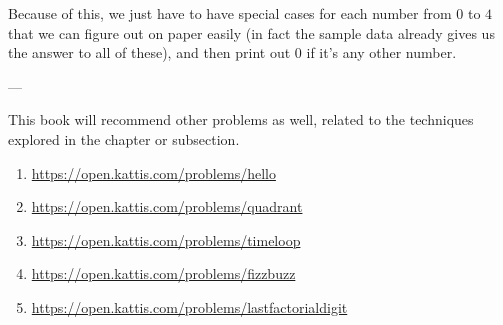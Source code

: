 Because of this, we just have to have special cases for each number from $0$ to $4$ that we can figure out on paper easily (in fact the sample data already gives us the answer to all of these), and then print out $0$ if it's any other number.

---

This book will recommend other problems as well, related to the techniques explored in the chapter or subsection.

\begin{enumerate}
\item \url{https://open.kattis.com/problems/hello}
\item \url{https://open.kattis.com/problems/quadrant}
\item \url{https://open.kattis.com/problems/timeloop}
\item \url{https://open.kattis.com/problems/fizzbuzz}
\item \url{https://open.kattis.com/problems/lastfactorialdigit}
\end{enumerate}
